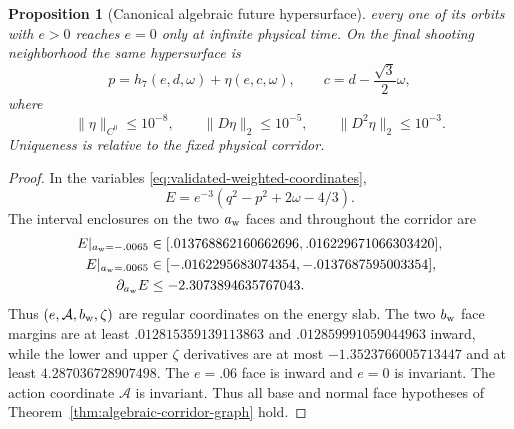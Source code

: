 \documentclass[11pt]{amsart}
\numberwithin{equation}{section}
\newtheorem{proposition}[theorem]{Proposition}
\theoremstyle{definition}
\theoremstyle{remark}
\newcommand{\cA}{\mathcal A}
\begin{document}
\begin{proposition}[Canonical algebraic future hypersurface]
every one of its orbits with $e>0$ reaches $e=0$ only at infinite physical
time.  On the final shooting neighborhood the same hypersurface is
\begin{equation}\label{eq:validated-unweighted-graph}
 p=h_7(e,d,\omega)+\eta(e,c,\omega),\qquad
 c=d-\frac{\sqrt3}{2}\omega,
\end{equation}
where
\begin{equation}\label{eq:validated-unweighted-budgets}
 \|\eta\|_{C^0}\le10^{-8},\qquad
 \|D\eta\|_2\le10^{-5},\qquad
 \|D^2\eta\|_2\le10^{-3}.
\end{equation}
Uniqueness is relative to the fixed physical corridor.
\end{proposition}

\begin{proof}
In the variables \eqref{eq:validated-weighted-coordinates},
\begin{equation}\label{eq:validated-weighted-energy}
 E=e^{-3}(q^2-p^2+2\omega-4/3).
\end{equation}
The interval enclosures on the two $a_{\rm w}$ faces and throughout the
corridor are
\begin{align}
 E|_{a_{\rm w}=-.0065}
 &\in[.013768862160662696,.016229671066303420],\notag\\
 E|_{a_{\rm w}=.0065}
 &\in[-.0162295683074354,-.0137687595003354],
 \label{eq:validated-energy-faces}\\
 \partial_{a_{\rm w}}E
 &\le-2.3073894635767043.\notag
\end{align}
Thus $(e,\cA,b_{\rm w},\zeta)$ are regular coordinates on the energy slab.
The two $b_{\rm w}$ face margins are at least
$.012815359139113863$ and $.012859991059044963$ inward, while the lower and
upper $\zeta$ derivatives are at most $-1.3523766005713447$ and at least
$4.287036728907498$.  The $e=.06$ face is inward and $e=0$ is invariant.
The action coordinate $\cA$ is invariant.  Thus all base and normal face
hypotheses of Theorem~\ref{thm:algebraic-corridor-graph} hold.


\end{proof}
\end{document}
